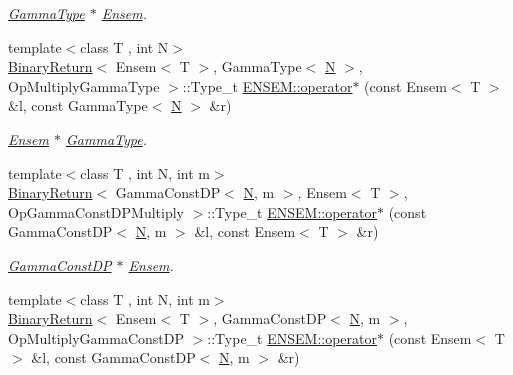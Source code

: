 \begin{DoxyCompactItemize}
\begin{DoxyCompactList}\small\item\em \mbox{\hyperlink{classENSEM_1_1GammaType}{Gamma\+Type}} $\ast$ \mbox{\hyperlink{classENSEM_1_1Ensem}{Ensem}}. \end{DoxyCompactList}\item 
{\footnotesize template$<$class T , int N$>$ }\\\mbox{\hyperlink{structBinaryReturn}{Binary\+Return}}$<$ Ensem$<$ T $>$, Gamma\+Type$<$ \mbox{\hyperlink{adat__devel_2lib_2hadron_2operator__name__util_8cc_a7722c8ecbb62d99aee7ce68b1752f337}{N}} $>$, Op\+Multiply\+Gamma\+Type $>$\+::Type\+\_\+t \mbox{\hyperlink{group__eensem_ga5a4ddba3b396c11e474246b57940a2cc}{E\+N\+S\+E\+M\+::operator$\ast$}} (const Ensem$<$ T $>$ \&l, const Gamma\+Type$<$ \mbox{\hyperlink{adat__devel_2lib_2hadron_2operator__name__util_8cc_a7722c8ecbb62d99aee7ce68b1752f337}{N}} $>$ \&r)
\begin{DoxyCompactList}\small\item\em \mbox{\hyperlink{classENSEM_1_1Ensem}{Ensem}} $\ast$ \mbox{\hyperlink{classENSEM_1_1GammaType}{Gamma\+Type}}. \end{DoxyCompactList}\item 
{\footnotesize template$<$class T , int N, int m$>$ }\\\mbox{\hyperlink{structBinaryReturn}{Binary\+Return}}$<$ Gamma\+Const\+DP$<$ \mbox{\hyperlink{adat__devel_2lib_2hadron_2operator__name__util_8cc_a7722c8ecbb62d99aee7ce68b1752f337}{N}}, m $>$, Ensem$<$ T $>$, Op\+Gamma\+Const\+D\+P\+Multiply $>$\+::Type\+\_\+t \mbox{\hyperlink{group__eensem_ga60f93a7eee86e9559faa6e162cf9b9a1}{E\+N\+S\+E\+M\+::operator$\ast$}} (const Gamma\+Const\+DP$<$ \mbox{\hyperlink{adat__devel_2lib_2hadron_2operator__name__util_8cc_a7722c8ecbb62d99aee7ce68b1752f337}{N}}, m $>$ \&l, const Ensem$<$ T $>$ \&r)
\begin{DoxyCompactList}\small\item\em \mbox{\hyperlink{classENSEM_1_1GammaConstDP}{Gamma\+Const\+DP}} $\ast$ \mbox{\hyperlink{classENSEM_1_1Ensem}{Ensem}}. \end{DoxyCompactList}\item 
{\footnotesize template$<$class T , int N, int m$>$ }\\\mbox{\hyperlink{structBinaryReturn}{Binary\+Return}}$<$ Ensem$<$ T $>$, Gamma\+Const\+DP$<$ \mbox{\hyperlink{adat__devel_2lib_2hadron_2operator__name__util_8cc_a7722c8ecbb62d99aee7ce68b1752f337}{N}}, m $>$, Op\+Multiply\+Gamma\+Const\+DP $>$\+::Type\+\_\+t \mbox{\hyperlink{group__eensem_ga0377e46872c4fb569a240b0b60ef577e}{E\+N\+S\+E\+M\+::operator$\ast$}} (const Ensem$<$ T $>$ \&l, const Gamma\+Const\+DP$<$ \mbox{\hyperlink{adat__devel_2lib_2hadron_2operator__name__util_8cc_a7722c8ecbb62d99aee7ce68b1752f337}{N}}, m $>$ \&r)

\end{DoxyCompactItemize}

